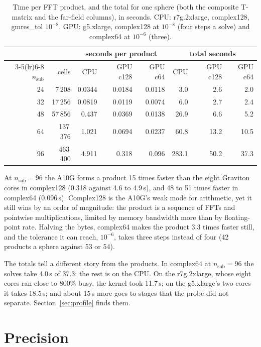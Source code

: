 \documentclass[11pt,a4paper]{article}
\newcommand{\nsub}{n_{\mathrm{sub}}}
\begin{document}
\begin{table}[h]
\centering
\caption{Time per FFT product, and the total for one sphere (both the composite T-matrix and the far-field columns),
in seconds. CPU: r7g.2xlarge, complex128, gmres\_tol $10^{-8}$. GPU: g5.xlarge, complex128 at $10^{-8}$ (four
steps a solve) and complex64 at $10^{-6}$ (three).}
\label{tab:time}
\begin{tabular}{rr rrr rrr}
\toprule
& & \multicolumn{3}{c}{seconds per product} & \multicolumn{3}{c}{total seconds} \\
\cmidrule(lr){3-5}\cmidrule(lr){6-8}
$\nsub$ & cells & CPU & GPU c128 & GPU c64 & CPU & GPU c128 & GPU c64 \\
\midrule
24 & 7\,208 & 0.0344 & 0.0184 & 0.0118 & 3.0 & 2.6 & 2.0 \\
32 & 17\,256 & 0.0819 & 0.0119 & 0.0074 & 6.0 & 2.7 & 2.4 \\
48 & 57\,856 & 0.437 & 0.0369 & 0.0138 & 26.9 & 6.6 & 5.2 \\
64 & 137\,376 & 1.021 & 0.0694 & 0.0237 & 60.8 & 13.2 & 10.5 \\
96 & 463\,400 & 4.911 & 0.318 & 0.096 & 283.1 & 50.2 & 37.3 \\
\bottomrule
\end{tabular}
\end{table}

At $\nsub = 96$ the A10G forms a product 15 times faster than the eight Graviton cores in complex128 (0.318 against
4.6 to 4.9\,s), and 48 to 51 times faster in complex64 (0.096\,s). Complex128 is the A10G's weak mode for arithmetic,
yet it still wins by an order of magnitude: the product is a sequence of FFTs and pointwise multiplications, limited
by memory bandwidth more than by floating-point rate. Halving the bytes, complex64 makes the product 3.3 times faster
still, and the tolerance it can reach, $10^{-6}$, takes three steps instead of four (42 products a sphere against 53
or 54).

The totals tell a different story from the products. In complex64 at $\nsub = 96$ the solves take 4.0\,s of 37.3: the
rest is on the CPU. On the r7g.2xlarge, whose eight cores ran close to 800\% busy, the kernel took 11.7\,s; on the
g5.xlarge's two cores it takes 18.5\,s; and about 15\,s more goes to stages that the probe did not separate. Section~\ref{sec:profile} finds
them.

\section{Precision}\label{sec:precision}
\end{document}
